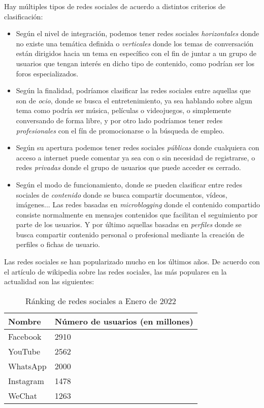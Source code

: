 Hay múltiples tipos de redes sociales de acuerdo a distintos criterios de clasificación:
\begin{itemize}
    \item Según el nivel de integración, podemos tener redes sociales \textit{horizontales} donde no existe una temática definida o \textit{verticales} donde los temas de conversación están dirigidos hacia un tema en específico con el fin de juntar a un grupo de usuarios que tengan interés en dicho tipo de contenido, como podrían ser los foros especializados.
    \item Según la finalidad, podríamos clasificar las redes sociales entre aquellas que son de \textit{ocio}, donde se busca el entretenimiento, ya sea hablando sobre algun tema como podría ser música, películas o videojuegos, o simplemente conversando de forma libre, y por otro lado podríamos tener redes \textit{profesionales} con el fín de promocionarse o la búsqueda de empleo.
    \item Según su apertura podemos tener redes sociales \textit{públicas} donde cualquiera con acceso a internet puede comentar ya sea con o sin necesidad de registrarse, o redes \textit{privadas} donde el grupo de usuarios que puede acceder es cerrado.
    \item Según el modo de funcionamiento, donde se pueden clasificar entre redes sociales de \textit{contenido} donde se busca compartir documentos, vídeos, imágenes... Las redes basadas en \textit{microblogging} donde el contenido compartido consiste normalmente en mensajes contenidos que facilitan el seguimiento por parte de los usuarios. Y por último aquellas basadas en \textit{perfiles} donde se busca compartir contenido personal o profesional mediante la creación de perfiles o fichas de usuario.
\end{itemize}

Las redes sociales se han popularizado mucho en los últimos años. De acuerdo con el artículo de wikipedia sobre las redes sociales, las más populares en la actualidad son las siguientes:

\begin{table}[h]
    \centering
    \begin{tabular}{|l|l|}
        \hline
        Nombre    & Número de usuarios (en millones) \\ \hline
        Facebook  & 2910              \\ \hline
        YouTube   & 2562              \\ \hline
        WhatsApp  & 2000              \\ \hline
        Instagram & 1478              \\ \hline
        WeChat    & 1263              \\ \hline
    \end{tabular}
    \caption{Ránking de redes sociales a Enero de 2022}
    \label{tab:socmed_ranking}
\end{table}

